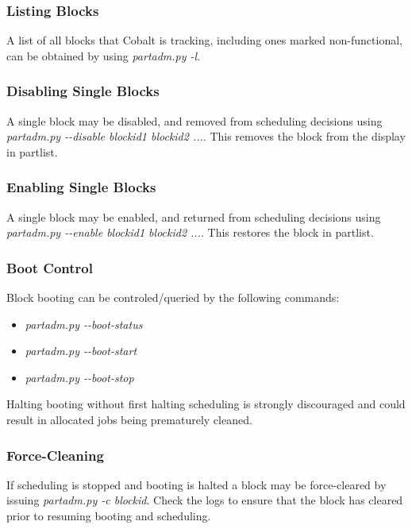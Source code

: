 \documentclass[10pt,letterpaper]{article}
\begin{document}
\subsubsection*{Listing Blocks}
A list of all blocks that Cobalt is tracking, including ones marked non-functional, can be obtained by using \textit{partadm.py -l}.
\subsubsection*{Disabling Single Blocks}
A single block may be disabled, and removed from scheduling decisions using \textit{partadm.py -\--disable blockid1 blockid2 ...}. This removes the block from the display in partlist.
\subsubsection*{Enabling Single Blocks}
A single block may be enabled, and returned from scheduling decisions using \textit{partadm.py -\--enable blockid1 blockid2 ...}. This restores the block in partlist.
\subsubsection*{Boot Control}
Block booting can be controled/queried by the following commands:
\begin{itemize}
\item \textit{partadm.py -\--boot-status}
\item \textit{partadm.py -\--boot-start}
\item \textit{partadm.py -\--boot-stop}
\end{itemize}
Halting booting without first halting scheduling is strongly discouraged and could result in allocated jobs being prematurely cleaned.
\subsubsection*{Force-Cleaning}
If scheduling is stopped and booting is halted a block may be force-cleared by issuing \textit{partadm.py -c blockid}.  Check the logs to ensure that the block has cleared prior to resuming booting and scheduling.
\end{document}
